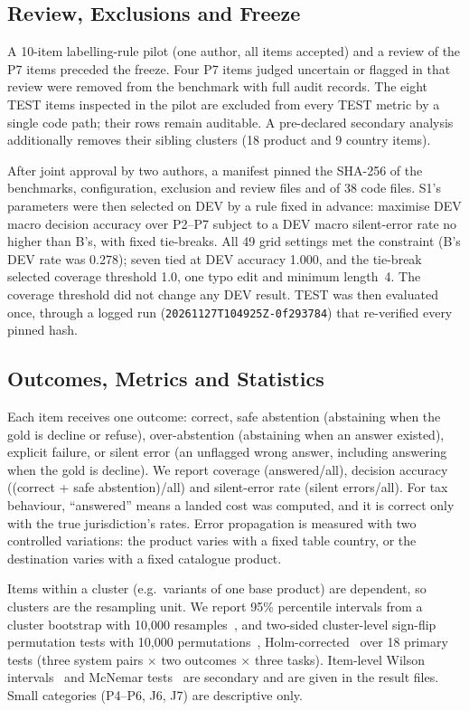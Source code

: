 \documentclass[conference]{IEEEtran}
\begin{document}


\subsection{Review, Exclusions and Freeze}
A 10-item labelling-rule pilot (one author, all items accepted) and a review of the P7
items preceded the freeze. Four P7 items judged uncertain or flagged in that review were removed from the benchmark with full audit
records. The eight TEST items inspected in the pilot are excluded from every TEST metric by a single code path; their rows
remain auditable. A pre-declared secondary analysis additionally removes their sibling clusters (18 product and 9
country items).

After joint approval by two authors, a manifest pinned the SHA-256 of the
benchmarks, configuration, exclusion and review files and of 38 code files. S1's parameters were then selected on DEV
by a rule fixed in advance: maximise DEV macro decision accuracy over P2--P7 subject to a DEV macro silent-error rate no
higher than B's, with fixed tie-breaks. All 49 grid settings met the constraint (B's DEV rate was 0.278); seven tied at
DEV accuracy 1.000, and the tie-break selected coverage threshold 1.0, one typo edit and minimum length~4. The coverage
threshold did not change any DEV result. TEST was then evaluated once, through a logged run
(\texttt{20261127T104925Z-0f293784}) that re-verified every pinned hash.

\subsection{Outcomes, Metrics and Statistics}
Each item receives one outcome: correct, safe abstention (abstaining when the gold is
decline or refuse), over-abstention (abstaining when an answer existed), explicit failure, or silent error (an
unflagged wrong answer, including answering when the gold is decline). We report coverage (answered/all), decision
accuracy ((correct + safe abstention)/all) and silent-error rate (silent errors/all). For tax behaviour, ``answered''
means a landed cost was computed, and it is correct only with the true jurisdiction's rates. Error propagation is
measured with two controlled variations: the product varies with a fixed table country, or the destination varies with a
fixed catalogue product.

Items within a cluster (e.g.\ variants of one base product) are dependent, so clusters are the
resampling unit. We report 95\% percentile intervals from a cluster bootstrap with 10{,}000
resamples~\cite{efron1994, field2007}, and two-sided cluster-level sign-flip permutation tests with 10{,}000
permutations~\cite{good2005}, Holm-corrected~\cite{holm1979} over 18 primary tests (three system pairs $\times$ two
outcomes $\times$ three tasks). Item-level Wilson intervals~\cite{wilson1927} and McNemar tests~\cite{mcnemar1947} are
secondary and are given in the result files. Small categories (P4--P6, J6, J7) are descriptive only.
\end{document}
